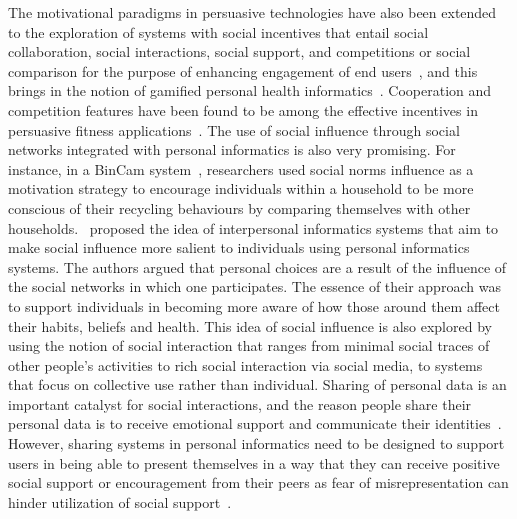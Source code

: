 The motivational paradigms in persuasive technologies have also been extended to the exploration of systems with social incentives that entail social collaboration, social interactions, social support, and competitions or social comparison for the purpose of enhancing engagement of end users~\citep{ploderer2014social,chen2016social,epstein2015nobody,reno2016matters}, and this brings in the notion of gamified personal health informatics~\citep{lin2006:fish,chen2014healthytogether,han2014designing}. Cooperation and competition features have been found to be among the effective incentives in persuasive fitness applications~\citep{chen2016social}. The use of social influence through social networks integrated with personal informatics is also very promising. For instance, in a BinCam system~\citep{comber2013bincam,comber2013designing}, researchers used social norms influence as a motivation strategy to encourage individuals within a household to be more conscious of their recycling behaviours by comparing themselves with other households.~\cite{bales2011interpersonal} proposed the idea of interpersonal informatics systems that aim to make social influence more salient to individuals using personal informatics systems. The authors argued that personal choices are a result of the influence of the social networks in which one participates. The essence of their approach was to support individuals in becoming more aware of how those around them affect their habits, beliefs and health. This idea of social influence is also explored by~\cite{ploderer2014social} using the notion of social interaction that ranges from minimal social traces of other people's activities to rich social interaction via social media, to systems that focus on collective use rather than individual. Sharing of personal data is an important catalyst for social interactions, and the reason people share their personal data is to receive emotional support and communicate their identities~\citep{epstein2015nobody}. However, sharing systems in personal informatics need to be designed to support users in being able to present themselves in a way that they can receive positive social support or encouragement from their peers as fear of misrepresentation can hinder utilization of social support~\citep{ploderer2014social,epstein2015nobody,reno2016matters}.

